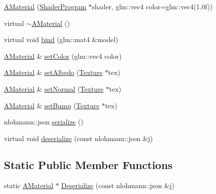 \begin{DoxyCompactItemize}
\item 
\mbox{\hyperlink{class_beer_engine_1_1_graphics_1_1_a_material_a1bc44d62a29a702f65757cc12f8d8c07}{A\+Material}} (\mbox{\hyperlink{class_beer_engine_1_1_graphics_1_1_shader_program}{Shader\+Program}} $\ast$shader, glm\+::vec4 color=glm\+::vec4(1.\+0f))
\item 
virtual \mbox{\hyperlink{class_beer_engine_1_1_graphics_1_1_a_material_af2e6f86707ff598c6b22f630fea027fb}{$\sim$\+A\+Material}} ()
\item 
virtual void \mbox{\hyperlink{class_beer_engine_1_1_graphics_1_1_a_material_a9f656d86c291077f108f62b19809aae1}{bind}} (glm\+::mat4 \&model)
\item 
\mbox{\hyperlink{class_beer_engine_1_1_graphics_1_1_a_material}{A\+Material}} \& \mbox{\hyperlink{class_beer_engine_1_1_graphics_1_1_a_material_aee06176499221fa6f100299bbd9bf24a}{set\+Color}} (glm\+::vec4 color)
\item 
\mbox{\hyperlink{class_beer_engine_1_1_graphics_1_1_a_material}{A\+Material}} \& \mbox{\hyperlink{class_beer_engine_1_1_graphics_1_1_a_material_a2b891be27dfdc7ebad90ea529786d126}{set\+Albedo}} (\mbox{\hyperlink{class_beer_engine_1_1_graphics_1_1_texture}{Texture}} $\ast$tex)
\item 
\mbox{\hyperlink{class_beer_engine_1_1_graphics_1_1_a_material}{A\+Material}} \& \mbox{\hyperlink{class_beer_engine_1_1_graphics_1_1_a_material_aa7e96809befbf9fe3098f49aeef0d25a}{set\+Normal}} (\mbox{\hyperlink{class_beer_engine_1_1_graphics_1_1_texture}{Texture}} $\ast$tex)
\item 
\mbox{\hyperlink{class_beer_engine_1_1_graphics_1_1_a_material}{A\+Material}} \& \mbox{\hyperlink{class_beer_engine_1_1_graphics_1_1_a_material_a88a94faaf480849b803302a864b30e7e}{set\+Bump}} (\mbox{\hyperlink{class_beer_engine_1_1_graphics_1_1_texture}{Texture}} $\ast$tex)
\item 
nlohmann\+::json \mbox{\hyperlink{class_beer_engine_1_1_graphics_1_1_a_material_aaf0626af4ae3a8e004dfd3f1a23bd7c4}{serialize}} ()
\item 
virtual void \mbox{\hyperlink{class_beer_engine_1_1_graphics_1_1_a_material_afa6ac6e48d4433d62777d5fe9984faaa}{deserialize}} (const nlohmann\+::json \&j)
\end{DoxyCompactItemize}
\subsection*{Static Public Member Functions}
\begin{DoxyCompactItemize}
\item 
static \mbox{\hyperlink{class_beer_engine_1_1_graphics_1_1_a_material}{A\+Material}} $\ast$ \mbox{\hyperlink{class_beer_engine_1_1_graphics_1_1_a_material_af7b1dba516520bff75c3e71756959916}{Deserialize}} (const nlohmann\+::json \&j)
\end{DoxyCompactItemize}


